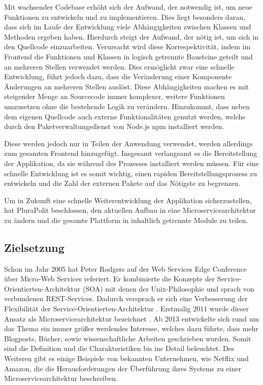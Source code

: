 Mit wachsender Codebase erhöht sich der Aufwand, der notwendig ist, um neue Funktionen zu entwickeln und zu implementieren. Dies liegt besonders daran, dass sich im Laufe der Entwicklung viele Abhängigkeiten zwischen Klassen und Methoden ergeben haben. Hierdurch steigt der Aufwand, der nötig ist, um sich in den Quellcode einzuarbeiten. Verursacht wird diese Korrespektivität, indem im Frontend die Funktionen und Klassen in logisch getrennte Bausteine geteilt und an mehreren Stellen verwendet werden. Dies ermöglicht zwar eine schnelle Entwicklung, führt jedoch dazu, dass die Veränderung einer Komponente Änderungen an mehreren Stellen auslöst. Diese Abhängigkeiten machen es mit steigender Menge an Sourcecode immer komplexer, weitere Funktionen umzusetzen ohne die bestehende Logik zu verändern. Hinzukommt, dass neben dem eigenen Quellcode auch externe Funktionalitäten genutzt werden, welche durch den Paketverwaltungsdienst von Node.js \parencite{nodejs} npm installiert werden.

Diese werden jedoch nur in Teilen der Anwendung verwendet, werden allerdings zum gesamten Frontend hinzugefügt. Insgesamt verlangsamt es die Bereitstellung der Applikation, da sie während des Prozesses installiert werden müssen. Für eine schnelle Entwicklung ist es somit wichtig, einen rapiden Bereitstellungsprozess zu entwickeln und die Zahl der externen Pakete auf das Nötigste zu begrenzen.

Um in Zukunft eine schnelle Weiterentwicklung der Applikation sicherzustellen, hat PluraPolit beschlossen, den aktuellen Aufbau in eine Microservicearchitektur zu ändern und die gesamte Plattform in inhaltlich getrennte Module zu teilen.

\subsection{Zielsetzung}
\label{sec:zielsetzung}

Schon im Jahr 2005 hat Peter Rodgers auf der Web Services Edge Conference über Micro-Web Services referiert. Er kombinierte die Konzepte der Service-Orientierten-Architektur (SOA) mit denen der Unix-Philosophie und sprach von verbundenen REST-Services. Dadurch versprach er sich eine Verbesserung der Flexibilität der Service-Orientierten-Architektur \parencite[vlg.][]{rodgers_peter}. Erstmalig 2011 wurde dieser Ansatz als Microservicearchitektur bezeichnet \parencite[vlg.][]{dragoni_microservices_2017}. Ab 2013 entwickelte sich rund um das Thema ein immer größer werdendes Interesse, welches dazu führte, dass mehr Blogposts, Bücher, sowie wissenschaftliche Arbeiten geschrieben wurden. Somit sind die Definition und die Charakteristiken bis ins Detail beleuchtet. Des Weiteren gibt es einige Beispiele von bekannten Unternehmen, wie Netflix und Amazon, die die Herausforderungen der Überführung ihres Systems zu einer Microservicearchitektur beschreiben.

